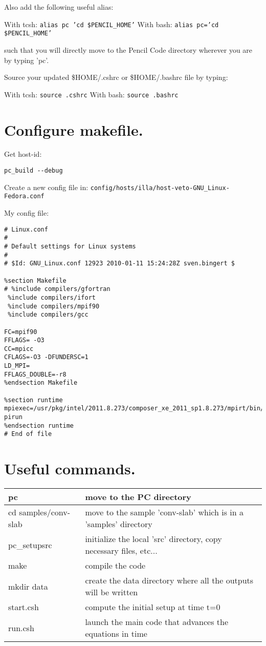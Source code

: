 \documentclass[a4paper,12pt]{article}
\begin{document}
 Also add the following useful alias:

With tcsh: \texttt{alias pc 'cd \$PENCIL\_HOME'}
With bash: \texttt{alias pc='cd \$PENCIL\_HOME'}

such that you will directly move to the Pencil Code directory wherever you are
by typing 'pc'.

Source your updated \$HOME/.cshrc or \$HOME/.bashrc file by typing:

With tcsh: \texttt{source .cshrc}
With bash: \texttt{source .bashrc}

\section{Configure makefile.}

Get host-id:
\begin{verbatim}
pc_build --debug
\end{verbatim}
Create a new config file in:
\texttt{config/hosts/illa/host-veto-GNU\_Linux-Fedora.conf}

My config file:
\begin{verbatim}
# Linux.conf
#
# Default settings for Linux systems
#
# $Id: GNU_Linux.conf 12923 2010-01-11 15:24:28Z sven.bingert $

%section Makefile
# %include compilers/gfortran
 %include compilers/ifort
 %include compilers/mpif90
 %include compilers/gcc

FC=mpif90 
FFLAGS= -O3  
CC=mpicc 
CFLAGS=-O3 -DFUNDERSC=1 
LD_MPI= 
FFLAGS_DOUBLE=-r8 
%endsection Makefile

%section runtime
mpiexec=/usr/pkg/intel/2011.8.273/composer_xe_2011_sp1.8.273/mpirt/bin/intel64/m
pirun
%endsection runtime
# End of file
\end{verbatim}



\section{Useful commands.}
\begin{center}
\begin{tabular}{|l|l|}\hline
pc & move to the PC directory\\\hline
cd samples/conv-slab & move to the sample 'conv-slab' which is in a 'samples'
directory\\\hline
pc\_setupsrc & initialize the local 'src' directory, copy necessary files,
etc...\\\hline
make & 	compile the code\\\hline
mkdir data & create the data directory where all the outputs will be written
\\\hline
start.csh & compute the initial setup at time t=0 \\\hline
run.csh & launch the main code that advances the equations in time\\\hline
\end{tabular}
\end{center}
\end{document}
